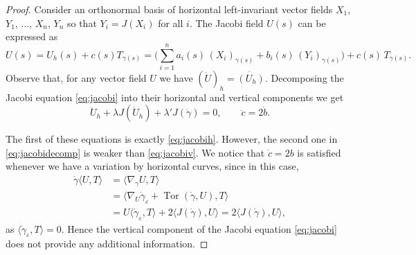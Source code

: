 \documentclass[10pt]{amsart}
\theoremstyle{definition}
\theoremstyle{remark}
\numberwithin{equation}{section}
\begin{document}
\begin{proof}
Consider an orthonormal basis of horizontal left-invariant vector fields $X_1$, $Y_1$, $\ldots$, $X_n$, $Y_n$ so that $Y_i=J(X_i)$ for all $i$. The Jacobi field $U(s)$ can be expressed as
\[
U(s)=U_h(s)+c(s)T_{{\gamma}(s)}=\bigg(\sum_{i=1}^n a_i(s)\,(X_i)_{{\gamma}(s)}+b_i(s)\,(Y_i)_{{\gamma}(s)}\bigg)+c(s)\,T_{{\gamma}(s)}.
\]
Observe that, for any vector field $U$ we have $(\dot{U})_h=\dot{(U_h)}$. Decomposing the Jacobi equation \eqref{eq:jacobi} into their horizontal and vertical components we get
\begin{equation}
\label{eq:jacobidecomp}
\ddot{U}_h+{\lambda} J(\dot{U}_h)+{\lambda}'J({\dot{\gamma}})=0,\qquad
\ddot{c}=2\dot{b}.
\end{equation}

The first of these equations is exactly \eqref{eq:jacobih}. However, the second one in \eqref{eq:jacobidecomp} is weaker than \eqref{eq:jacobiv}. We notice that $\dot{c}=2b$ is satisfied whenever we have a variation by horizontal curves, since in this case,
\begin{align*}
{\dot{\gamma}}{\langle{U,T}\rangle}&={\langle{\nabla_{\dot{\gamma}} U,T}\rangle}
\\
&={\langle{\nabla_U{\dot{\gamma}}_{\varepsilon}+\operatorname{Tor}({\dot{\gamma}},U),T}\rangle}
\\
&=U{\langle{{\dot{\gamma}}_{\varepsilon},T}\rangle}+2{\langle{J({\dot{\gamma}}),U}\rangle}=2{\langle{J({\dot{\gamma}}),U}\rangle},
\end{align*}
as ${\langle{{\dot{\gamma}}_{\varepsilon},T}\rangle}=0$. Hence the vertical component of the Jacobi equation \eqref{eq:jacobi} does not provide any additional information.


\end{proof}
\end{document}
